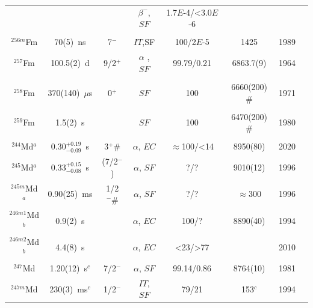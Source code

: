\begin{center}
\begin{longtable}{c|ccccccl}
			&				& 			&$\beta^-$, $SF$	&1.7$E$-4/<3.0$E$-6& 			&		&{\tiny\cite{Wild1985,Chasteler1987,Hall1989,Sokol1991,Ahmad2000,Kratz2013}}\\
			& 				&			&					&			&				    &		&{\tiny\cite{Devaraja2019,Pal2021}}\\
$^{256m}$Fm   & 70(5)~ns    & 7$^-$     & $IT$,SF           &100/2$E$-5 &1425	   		    &1989 	&{\tiny\cite{Hall1989}}\\
$^{257}$Fm	& 100.5(2)~d	& 9/2$^+$	&$\alpha$	, $SF$	&99.79/0.21	& 6863.7(9)		    &1964	&{\tiny\cite{Hulet1964,Sikkeland1965,CombChem1966,Asaro1967,Wild1973,Moody1993}}\\ 
			& 				&			&					&			&				    &		&{\tiny\cite{Holden2000,Kratz2013}}\\
$^{258}$Fm	& 370(140)~$\mu$s&  0$^+$	&$SF$				&100      	& 6660(200)$\#$	    &1971	&{\tiny\cite{Hulet1971,John1971,Hoffman1980,Hoffman1981,Hulet1986,Hulet1986a}}\\
			& 				&			&					&			&				    &		&{\tiny\cite{Hulet1989,Moody1993}}\\
$^{259}$Fm	& 1.5(2)~s		&  			&$SF$				&100		& 6470(200)$\#$	    &1980	&{\tiny\cite{Hulet1980,Hoffman1981,Holden2000}}\\
\hline\\
$^{244}$Md$^a$& 0.30$^{+0.19}_{-0.09}$~s&3$^+ \#$&$\alpha$, $EC$&$\approx$100/<14& 8950(80)	&2020	&{\tiny\cite{Pore2020,Khuyagbaatar2020,Hessberger2021}}\\
$^{245}$Md$^a$& 0.33$^{+0.15}_{-0.08}$~s & (7/2$^-$)&$\alpha$, $SF$ &?/?& 9010(12)	        &1996	&{\tiny\cite{Hofmann1994a,Khuyagbaatar2020,Hessberger2021}}\\
$^{245m}$Md$^a$&0.90(25)~ms& 1/2$^- \#$&$\alpha$, $SF$ 		&?/?		& $\approx$300	    &1996	&{\tiny\cite{Hofmann1994a,Holden2000,Khuyagbaatar2020,Hessberger2021}}\\
$^{246m1}$Md$^b$& 0.9(2)~s	&  			&$\alpha$, $EC$		& 100/?   	& 8890(40)   		&1994	&{\tiny\cite{Hofmann1994a,Ninov1996,Antalic2010}}\\
$^{246m2}$Md$^b$& 4.4(8)~s	&  			&$\alpha$, $EC$		&<23/>77	& 			        &2010	&{\tiny\cite{Antalic2010}}\\
$^{247}$Md	& 1.20(12)~s$^c$& 7/2$^-$	&$\alpha$, $SF$  	&99.14/0.86	& 8764(10)		    &1981	&{\tiny\cite{Muenzenberg1981a,Hofmann1994,Hessberger2005,Antalic2010,Hessberger2022}}\\
$^{247m}$Md	& 230(3)~ms$^c$ & 1/2$^-$	&$IT$, $SF$  		&79/21		& 153$^c$		    &1994	&{\tiny\cite{Hofmann1994,Hessberger2005,Antalic2010,Hessberger2022}}\\

\end{longtable}
\end{center}

